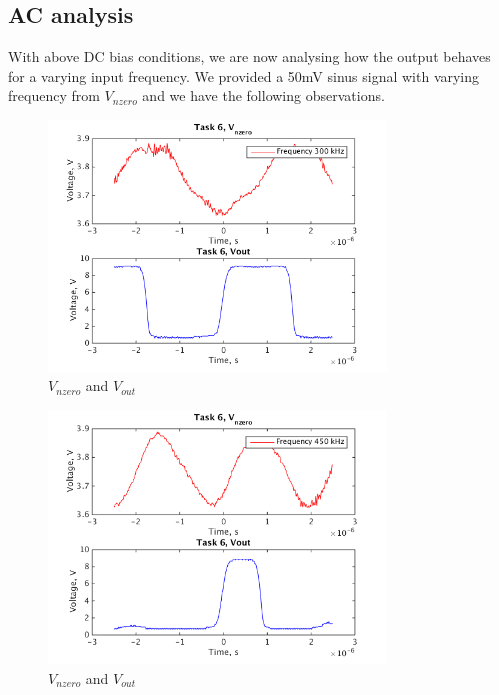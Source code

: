 \documentclass[a4paper,english,11pt]{article}
\begin{document}
\subsection*{AC analysis}
With above DC bias conditions, we are now analysing how the output behaves for a varying input frequency. We provided a 50mV sinus signal with varying frequency from  $V_{nzero}$ and we have the following observations.


\begin{figure}[H]
 \centering
  \includegraphics[width=0.8\textwidth]{img/task6_b_1.png}
  \caption{ $V_{nzero}$ and  $V_{out}$}
  \label{freq1}	
\end{figure}

\begin{figure}[H]
 \centering
  \includegraphics[width=0.8\textwidth]{img/task_b_2.png}
  \caption{ $V_{nzero}$ and  $V_{out}$}
  \label{freq2}	
\end{figure}
\end{document}
